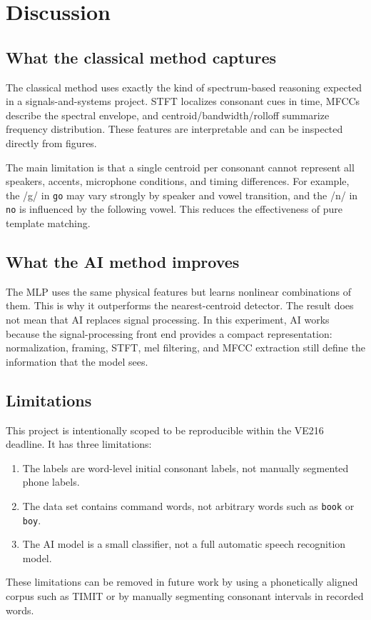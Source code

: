 \documentclass[11pt]{article}
\begin{document}
\section{Discussion}

\subsection{What the classical method captures}

The classical method uses exactly the kind of spectrum-based reasoning expected in a signals-and-systems project.  STFT localizes consonant cues in time, MFCCs describe the spectral envelope, and centroid/bandwidth/rolloff summarize frequency distribution.  These features are interpretable and can be inspected directly from figures.

The main limitation is that a single centroid per consonant cannot represent all speakers, accents, microphone conditions, and timing differences.  For example, the /g/ in \texttt{go} may vary strongly by speaker and vowel transition, and the /n/ in \texttt{no} is influenced by the following vowel.  This reduces the effectiveness of pure template matching.

\subsection{What the AI method improves}

The MLP uses the same physical features but learns nonlinear combinations of them.  This is why it outperforms the nearest-centroid detector.  The result does not mean that AI replaces signal processing.  In this experiment, AI works because the signal-processing front end provides a compact representation: normalization, framing, STFT, mel filtering, and MFCC extraction still define the information that the model sees.

\subsection{Limitations}

This project is intentionally scoped to be reproducible within the VE216 deadline.  It has three limitations:
\begin{enumerate}[nosep]
    \item The labels are word-level initial consonant labels, not manually segmented phone labels.
    \item The data set contains command words, not arbitrary words such as \texttt{book} or \texttt{boy}.
    \item The AI model is a small classifier, not a full automatic speech recognition model.
\end{enumerate}
These limitations can be removed in future work by using a phonetically aligned corpus such as TIMIT or by manually segmenting consonant intervals in recorded words.
\end{document}
